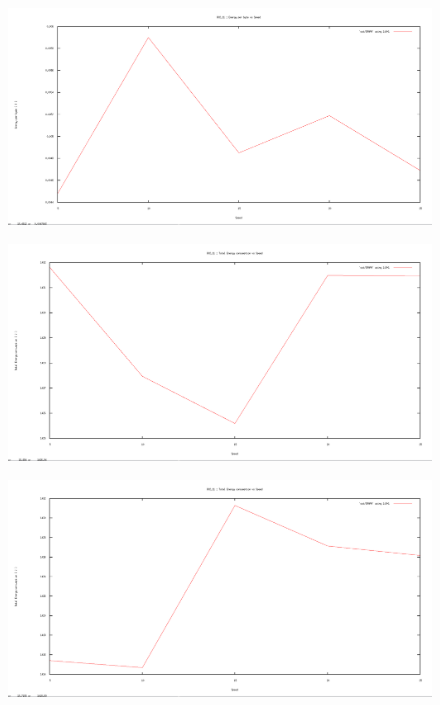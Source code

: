 \documentclass[12pt]{article}
\begin{document}
\begin{figure}[H]
	\centering
	\includegraphics[scale=	0.26]{image/apics/am_energyperbyte_vs_speed.png}
\end{figure}

\begin{figure}[H]
	\centering
	\includegraphics[scale=	0.26]{image/bpics/bm_energyconsumption_vs_speed.png}
\end{figure}

\begin{figure}[H]
	\centering
	\includegraphics[scale=	0.26]{image/apics/am_energyconsumption_vs_speed.png}
\end{figure}
\end{document}
